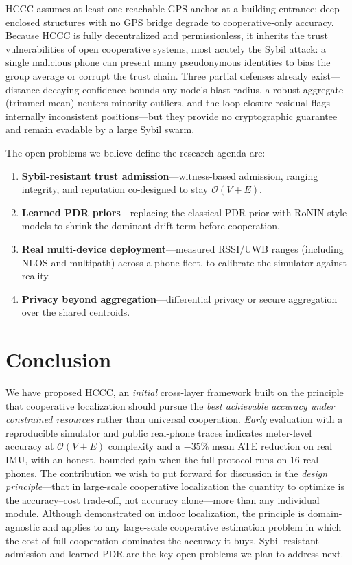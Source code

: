 \documentclass{ceurart}
\theoremstyle{definition}
\begin{document}
HCCC assumes at least one reachable GPS anchor at a building entrance; deep enclosed
structures with no GPS bridge degrade to cooperative-only accuracy. Because HCCC is
fully decentralized and permissionless, it inherits the trust vulnerabilities of open
cooperative systems, most acutely the Sybil attack: a single malicious phone can
present many pseudonymous identities to bias the group average or corrupt the trust
chain. Three partial defenses already exist---distance-decaying confidence bounds any
node's blast radius, a robust aggregate (trimmed mean) neuters minority outliers, and
the loop-closure residual flags internally inconsistent positions---but they provide
no cryptographic guarantee and remain evadable by a large Sybil swarm.

The open problems we believe define the research agenda are:
\begin{enumerate}
\item \textbf{Sybil-resistant trust admission}---witness-based admission, ranging
  integrity, and reputation co-designed to stay $\mathcal{O}(V+E)$.
\item \textbf{Learned PDR priors}---replacing the classical PDR prior with RoNIN-style
  models to shrink the dominant drift term before cooperation.
\item \textbf{Real multi-device deployment}---measured RSSI/UWB ranges (including NLOS
  and multipath) across a phone fleet, to calibrate the simulator against reality.
\item \textbf{Privacy beyond aggregation}---differential privacy or secure aggregation
  over the shared centroids.
\end{enumerate}

\section{Conclusion}
\label{sec:concl}

We have proposed HCCC, an \emph{initial} cross-layer framework built on the principle
that cooperative localization should pursue the \emph{best achievable accuracy under
constrained resources} rather than universal cooperation. \emph{Early} evaluation with
a reproducible simulator and public real-phone traces indicates meter-level accuracy
at $\mathcal{O}(V+E)$ complexity and a $-35\%$ mean ATE reduction on real IMU, with an
honest, bounded gain when the full protocol runs on $16$ real phones. The contribution
we wish to put forward for discussion is the \emph{design principle}---that in
large-scale cooperative localization the quantity to optimize is the accuracy--cost
trade-off, not accuracy alone---more than any individual module. Although demonstrated
on indoor localization, the principle is domain-agnostic and applies to any
large-scale cooperative estimation problem in which the cost of full cooperation
dominates the accuracy it buys. Sybil-resistant admission and learned PDR are the key
open problems we plan to address next.
\end{document}
